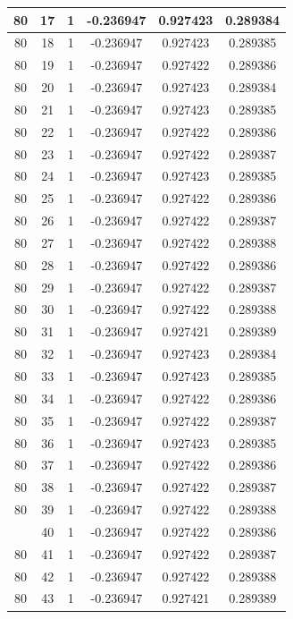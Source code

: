 \documentclass[12pt,a4paper]{article}
\numberwithin{equation}{section}
\numberwithin{figure}{section}
\numberwithin{table}{section}
\begin{document}
\begin{longtable}{|c|c|c|c|c|c|}
80 & 17 & 1 & -0.236947 & 0.927423 & 0.289384 \\ \hline
80 & 18 & 1 & -0.236947 & 0.927423 & 0.289385 \\ \hline
80 & 19 & 1 & -0.236947 & 0.927422 & 0.289386 \\ \hline
80 & 20 & 1 & -0.236947 & 0.927423 & 0.289384 \\ \hline
80 & 21 & 1 & -0.236947 & 0.927423 & 0.289385 \\ \hline
80 & 22 & 1 & -0.236947 & 0.927422 & 0.289386 \\ \hline
80 & 23 & 1 & -0.236947 & 0.927422 & 0.289387 \\ \hline
80 & 24 & 1 & -0.236947 & 0.927423 & 0.289385 \\ \hline
80 & 25 & 1 & -0.236947 & 0.927422 & 0.289386 \\ \hline
80 & 26 & 1 & -0.236947 & 0.927422 & 0.289387 \\ \hline
80 & 27 & 1 & -0.236947 & 0.927422 & 0.289388 \\ \hline
80 & 28 & 1 & -0.236947 & 0.927422 & 0.289386 \\ \hline
80 & 29 & 1 & -0.236947 & 0.927422 & 0.289387 \\ \hline
80 & 30 & 1 & -0.236947 & 0.927422 & 0.289388 \\ \hline
80 & 31 & 1 & -0.236947 & 0.927421 & 0.289389 \\ \hline
80 & 32 & 1 & -0.236947 & 0.927423 & 0.289384 \\ \hline
80 & 33 & 1 & -0.236947 & 0.927423 & 0.289385 \\ \hline
80 & 34 & 1 & -0.236947 & 0.927422 & 0.289386 \\ \hline
80 & 35 & 1 & -0.236947 & 0.927422 & 0.289387 \\ \hline
80 & 36 & 1 & -0.236947 & 0.927423 & 0.289385 \\ \hline
80 & 37 & 1 & -0.236947 & 0.927422 & 0.289386 \\ \hline
80 & 38 & 1 & -0.236947 & 0.927422 & 0.289387 \\ \hline
80 & 39 & 1 & -0.236947 & 0.927422 & 0.289388 \\ \hline
\pagebreak
80 & 40 & 1 & -0.236947 & 0.927422 & 0.289386 \\ \hline
80 & 41 & 1 & -0.236947 & 0.927422 & 0.289387 \\ \hline
80 & 42 & 1 & -0.236947 & 0.927422 & 0.289388 \\ \hline
80 & 43 & 1 & -0.236947 & 0.927421 & 0.289389 \\ \hline

\end{longtable}
\end{document}
